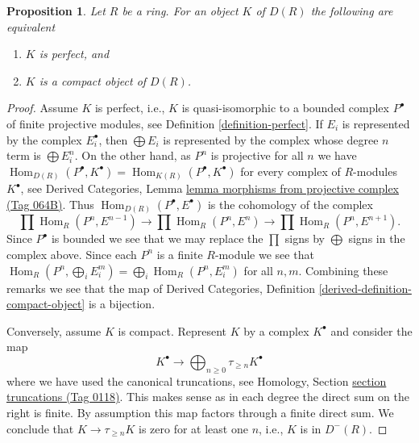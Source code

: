 \documentclass{amsart}
\theoremstyle{plain}
\newtheorem{proposition}[subsection]{Proposition}
\theoremstyle{definition}
\theoremstyle{remark}
\numberwithin{equation}{subsection}
\def\Hom{\mathop{\mathrm{Hom}}\nolimits}
\begin{document}
\begin{proposition}
\label{proposition-perfect-is-compact}
Let $R$ be a ring. For an object $K$ of $D(R)$ the following are equivalent
\begin{enumerate}
\item $K$ is perfect, and
\item $K$ is a compact object of $D(R)$.
\end{enumerate}
\end{proposition}

\begin{proof}
Assume $K$ is perfect, i.e., $K$ is quasi-isomorphic to a bounded complex
$P^\bullet$ of finite projective modules, see
Definition \ref{definition-perfect}. If $E_i$ is represented by the complex
$E_i^\bullet$, then $\bigoplus E_i$ is represented by the complex
whose degree $n$ term is $\bigoplus E_i^n$. On the other hand,
as $P^n$ is projective for all $n$ we have
$\Hom_{D(R)}(P^\bullet, K^\bullet) = \Hom_{K(R)}(P^\bullet, K^\bullet)$
for every complex of $R$-modules $K^\bullet$, see
Derived Categories,
Lemma \href{https://stacks.math.columbia.edu/tag/064B}{lemma morphisms from projective complex (Tag 064B)}.
Thus $\Hom_{D(R)}(P^\bullet, E^\bullet)$ is the cohomology of the complex
$$
\prod \Hom_R(P^n, E^{n - 1}) \to
\prod \Hom_R(P^n, E^n) \to
\prod \Hom_R(P^n, E^{n + 1}).
$$
Since $P^\bullet$ is bounded we see that we may replace the $\prod$
signs by $\bigoplus$ signs in the complex above. Since each $P^n$ is a finite
$R$-module we see that
$\Hom_R(P^n, \bigoplus_i E_i^m) = \bigoplus_i \Hom_R(P^n, E_i^m)$
for all $n, m$.
Combining these remarks we see that the map of
Derived Categories, Definition \ref{derived-definition-compact-object}
is a bijection.

\medskip\noindent
Conversely, assume $K$ is compact.
Represent $K$ by a complex $K^\bullet$ and consider the map
$$
K^\bullet
\longrightarrow
\bigoplus\nolimits_{n \geq 0} \tau_{\geq n} K^\bullet
$$
where we have used the canonical truncations, see
Homology, Section \href{https://stacks.math.columbia.edu/tag/0118}{section truncations (Tag 0118)}.
This makes sense as in each degree the direct sum on the right is finite.
By assumption this map factors through a finite direct sum.
We conclude that $K \to \tau_{\geq n} K$ is zero for at least one $n$,
i.e., $K$ is in $D^{-}(R)$.


\end{proof}
\end{document}
